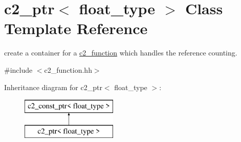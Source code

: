 \hypertarget{classc2__ptr}{\section{c2\-\_\-ptr$<$ float\-\_\-type $>$ Class Template Reference}
\label{classc2__ptr}
}


create a container for a \hyperlink{classc2__function}{c2\-\_\-function} which handles the reference counting.  




{\ttfamily \#include $<$c2\-\_\-function.\-hh$>$}

Inheritance diagram for c2\-\_\-ptr$<$ float\-\_\-type $>$\-:\begin{figure}[H]
\begin{center}
\leavevmode
\includegraphics[height=2.000000cm]{classc2__ptr}
\end{center}
\end{figure}
